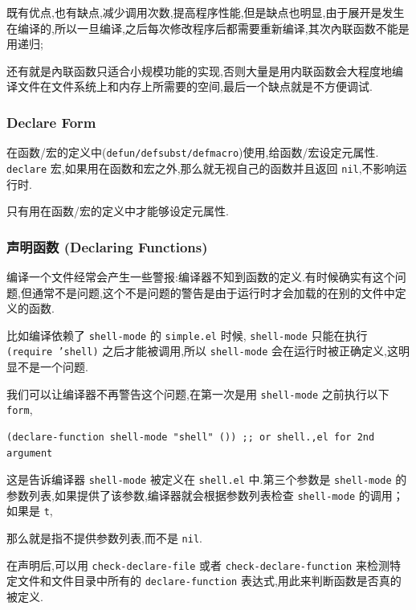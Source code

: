 \documentclass[11pt]{article}
\begin{document}
既有优点,也有缺点,减少调用次数,提高程序性能,但是缺点也明显,由于展开是发生在编译的,所以一旦编译,之后每次修改程序后都需要重新编译,其次內联函数不能是用递归;

还有就是內联函数只适合小规模功能的实现,否则大量是用内联函数会大程度地编译文件在文件系统上和内存上所需要的空间,最后一个缺点就是不方便调试.




\subsubsection{Declare Form}
\label{sec:org7969039}

在函数/宏的定义中(\texttt{defun/defsubst/defmacro})使用,给函数/宏设定元属性. \texttt{declare} 宏,如果用在函数和宏之外,那么就无视自己的函数并且返回 \texttt{nil},不影响运行时.

只有用在函数/宏的定义中才能够设定元属性.




\subsubsection{声明函数 (Declaring Functions)}
\label{sec:org7f9467f}

编译一个文件经常会产生一些警报:编译器不知到函数的定义.有时候确实有这个问题,但通常不是问题,这个不是问题的警告是由于运行时才会加载的在别的文件中定义的函数.

比如编译依赖了 \texttt{shell-mode} 的 \texttt{simple.el} 时候, \texttt{shell-mode} 只能在执行 \texttt{(require 'shell)} 之后才能被调用,所以 \texttt{shell-mode} 会在运行时被正确定义,这明显不是一个问题.

我们可以让编译器不再警告这个问题,在第一次是用 \texttt{shell-mode} 之前执行以下 \texttt{form},

\begin{verbatim}
(declare-function shell-mode "shell" ()) ;; or shell.,el for 2nd argument
\end{verbatim}

这是告诉编译器 \texttt{shell-mode} 被定义在 \texttt{shell.el} 中.第三个参数是 \texttt{shell-mode} 的参数列表,如果提供了该参数,编译器就会根据参数列表检查 \texttt{shell-mode} 的调用；如果是 \texttt{t},

那么就是指不提供参数列表,而不是 \texttt{nil}.

在声明后,可以用 \texttt{check-declare-file} 或者 \texttt{check-declare-function} 来检测特定文件和文件目录中所有的 \texttt{declare-function} 表达式,用此来判断函数是否真的被定义.
\end{document}
